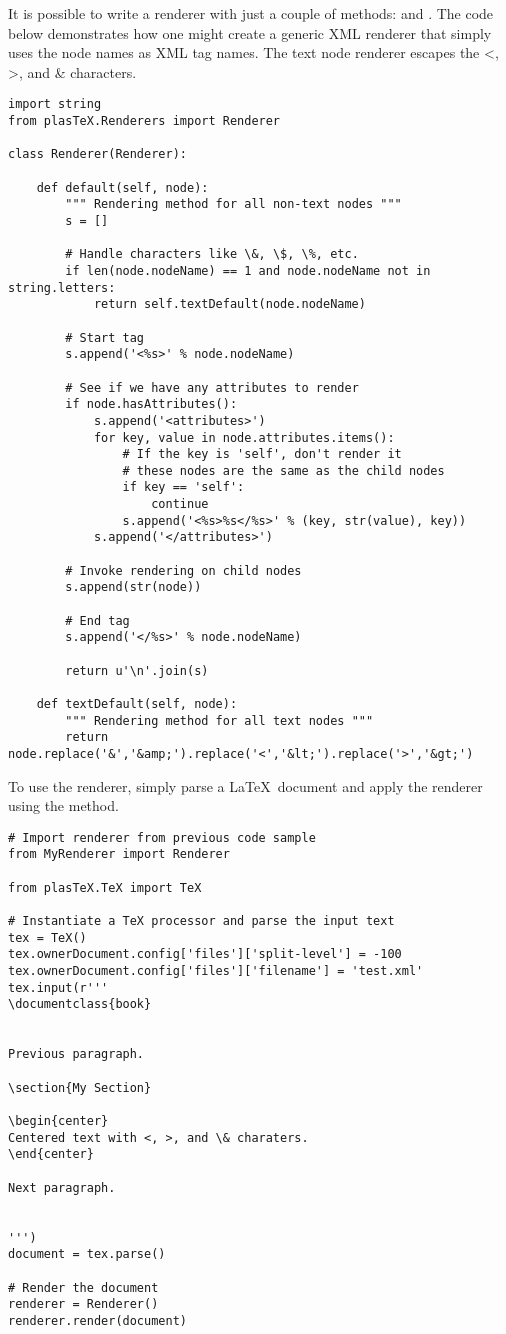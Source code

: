 It is possible to write a renderer with just a couple of methods:
 and .
The code below demonstrates how one might create a generic XML
renderer that simply uses the node names as XML tag names.
The text node renderer escapes the <, >, and \& characters.
\begin{verbatim}
import string
from plasTeX.Renderers import Renderer

class Renderer(Renderer):

    def default(self, node):
        """ Rendering method for all non-text nodes """
        s = []

        # Handle characters like \&, \$, \%, etc.
        if len(node.nodeName) == 1 and node.nodeName not in string.letters:
            return self.textDefault(node.nodeName)

        # Start tag
        s.append('<%s>' % node.nodeName)

        # See if we have any attributes to render
        if node.hasAttributes():
            s.append('<attributes>')
            for key, value in node.attributes.items():
                # If the key is 'self', don't render it
                # these nodes are the same as the child nodes
                if key == 'self':
                    continue
                s.append('<%s>%s</%s>' % (key, str(value), key))
            s.append('</attributes>')

        # Invoke rendering on child nodes
        s.append(str(node))

        # End tag
        s.append('</%s>' % node.nodeName)

        return u'\n'.join(s)

    def textDefault(self, node):
        """ Rendering method for all text nodes """
        return node.replace('&','&amp;').replace('<','&lt;').replace('>','&gt;')
\end{verbatim}

To use the renderer, simply parse a \LaTeX\ document and apply the renderer
using the  method.
\begin{verbatim}
# Import renderer from previous code sample
from MyRenderer import Renderer

from plasTeX.TeX import TeX

# Instantiate a TeX processor and parse the input text
tex = TeX()
tex.ownerDocument.config['files']['split-level'] = -100
tex.ownerDocument.config['files']['filename'] = 'test.xml'
tex.input(r'''
\documentclass{book}


Previous paragraph.

\section{My Section}

\begin{center}
Centered text with <, >, and \& charaters.
\end{center}

Next paragraph.


''')
document = tex.parse()

# Render the document
renderer = Renderer()
renderer.render(document)
\end{verbatim}

